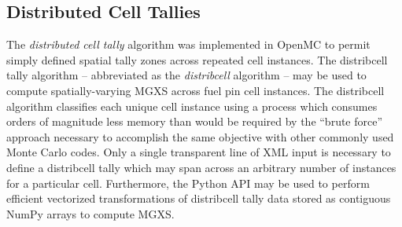 \subsection{Distributed Cell Tallies}
\label{subsec:distribcells}


The \emph{distributed cell tally} algorithm was implemented in OpenMC \cite{lax2014distribcell} to permit simply defined spatial tally zones across repeated cell instances. The distribcell tally algorithm -- abbreviated as the \emph{distribcell} algorithm -- may be used to compute spatially-varying MGXS across fuel pin cell instances. The distribcell algorithm classifies each unique cell instance using a process which consumes orders of magnitude less memory than would be required by the ``brute force'' approach necessary to accomplish the same objective with other commonly used Monte Carlo codes. Only a single transparent line of XML input is necessary to define a distribcell tally which may span across an arbitrary number of instances for a particular cell. Furthermore, the Python API may be used to perform efficient vectorized transformations of distribcell tally data stored as contiguous NumPy arrays to compute MGXS.
